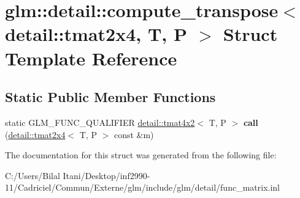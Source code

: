 \hypertarget{structglm_1_1detail_1_1compute__transpose_3_01detail_1_1tmat2x4_00_01_t_00_01_p_01_4}{}\section{glm\+:\+:detail\+:\+:compute\+\_\+transpose$<$ detail\+:\+:tmat2x4, T, P $>$ Struct Template Reference}
\label{structglm_1_1detail_1_1compute__transpose_3_01detail_1_1tmat2x4_00_01_t_00_01_p_01_4}
\subsection*{Static Public Member Functions}
\begin{DoxyCompactItemize}
\item 
static G\+L\+M\+\_\+\+F\+U\+N\+C\+\_\+\+Q\+U\+A\+L\+I\+F\+I\+ER \hyperlink{structglm_1_1detail_1_1tmat4x2}{detail\+::tmat4x2}$<$ T, P $>$ {\bfseries call} (\hyperlink{structglm_1_1detail_1_1tmat2x4}{detail\+::tmat2x4}$<$ T, P $>$ const \&m)\hypertarget{structglm_1_1detail_1_1compute__transpose_3_01detail_1_1tmat2x4_00_01_t_00_01_p_01_4_a773fe20856af1171dcc8d60246eea5d2}{}\label{structglm_1_1detail_1_1compute__transpose_3_01detail_1_1tmat2x4_00_01_t_00_01_p_01_4_a773fe20856af1171dcc8d60246eea5d2}

\end{DoxyCompactItemize}


The documentation for this struct was generated from the following file\+:\begin{DoxyCompactItemize}
\item 
C\+:/\+Users/\+Bilal Itani/\+Desktop/inf2990-\/11/\+Cadriciel/\+Commun/\+Externe/glm/include/glm/detail/func\+\_\+matrix.\+inl\end{DoxyCompactItemize}
